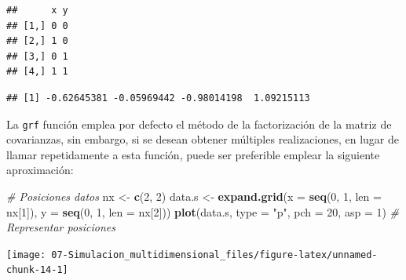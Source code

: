 \documentclass[
]{book}
\newenvironment{Shaded}{\begin{snugshade}}{\end{snugshade}}
\newcommand{\CommentTok}[1]{\textcolor[rgb]{0.56,0.35,0.01}{\textit{#1}}}
\newcommand{\DataTypeTok}[1]{\textcolor[rgb]{0.13,0.29,0.53}{#1}}
\newcommand{\DecValTok}[1]{\textcolor[rgb]{0.00,0.00,0.81}{#1}}
\newcommand{\KeywordTok}[1]{\textcolor[rgb]{0.13,0.29,0.53}{\textbf{#1}}}
\newcommand{\NormalTok}[1]{#1}
\newcommand{\OperatorTok}[1]{\textcolor[rgb]{0.81,0.36,0.00}{\textbf{#1}}}
\newcommand{\StringTok}[1]{\textcolor[rgb]{0.31,0.60,0.02}{#1}}
\theoremstyle{break}
\theoremstyle{definition}
\theoremstyle{definition}
\theoremstyle{definition}
\theoremstyle{remark}
\begin{document}
\begin{Shaded}
\end{Shaded}

\begin{verbatim}
##      x y
## [1,] 0 0
## [2,] 1 0
## [3,] 0 1
## [4,] 1 1
\end{verbatim}

\begin{Shaded}
\end{Shaded}

\begin{verbatim}
## [1] -0.62645381 -0.05969442 -0.98014198  1.09215113
\end{verbatim}

La \texttt{grf} función emplea por defecto el método de la factorización de la matriz de covarianzas,
sin embargo, si se desean obtener múltiples realizaciones, en lugar de llamar repetidamente a esta función,
puede ser preferible emplear la siguiente aproximación:

\begin{Shaded}
\begin{Highlighting}[]
\CommentTok{# Posiciones datos}
\NormalTok{nx <-}\StringTok{ }\KeywordTok{c}\NormalTok{(}\DecValTok{2}\NormalTok{, }\DecValTok{2}\NormalTok{)}
\NormalTok{data.s <-}\StringTok{ }\KeywordTok{expand.grid}\NormalTok{(}\DataTypeTok{x =} \KeywordTok{seq}\NormalTok{(}\DecValTok{0}\NormalTok{, }\DecValTok{1}\NormalTok{, }\DataTypeTok{len =}\NormalTok{ nx[}\DecValTok{1}\NormalTok{]), }\DataTypeTok{y =} \KeywordTok{seq}\NormalTok{(}\DecValTok{0}\NormalTok{, }\DecValTok{1}\NormalTok{, }\DataTypeTok{len =}\NormalTok{ nx[}\DecValTok{2}\NormalTok{]))}
\KeywordTok{plot}\NormalTok{(data.s, }\DataTypeTok{type =} \StringTok{"p"}\NormalTok{, }\DataTypeTok{pch =} \DecValTok{20}\NormalTok{, }\DataTypeTok{asp =} \DecValTok{1}\NormalTok{) }\CommentTok{# Representar posiciones}
\end{Highlighting}
\end{Shaded}

\begin{center}\texttt{[image: 07-Simulacion\_multidimensional\_files/figure-latex/unnamed-chunk-14-1]} \end{center}
\end{document}
